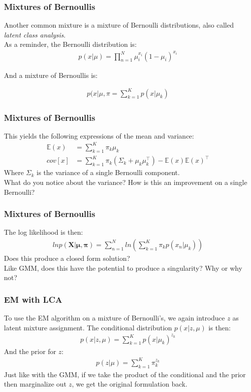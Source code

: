 \documentclass{beamer}
\begin{document}
\begin{frame}
\frametitle{Mixtures of Bernoullis}
	Another common mixture is a mixture of Bernoulli distributions, also called \textit{latent class analysis}.\\
	As a reminder, the Bernoulli distribution is:
	\begin{align*}
	p(x|\mu) = \prod_{n = 1}^{N} \mu_i^{x_i}(1 - \mu_i)^{x_i}
	\end{align*}
	
	And a mixture of Bernoullis is:
	
	\begin{align*}
		p(x|\mu, \pi = \sum_{k=1}^{K}p(x|\mu_k) 
	\end{align*}
\end{frame}


\begin{frame}
\frametitle{Mixtures of Bernoullis}
	This yields the following expressions of the mean and variance:
	\begin{align*}
	\mathbb{E}(x)& = \sum_{k=1}^{K} \pi_k \mu_k \\
	cov[x]  &= \sum_{k=1}^{K}  \pi_k (\Sigma_k + \mu_k \mu_k^{\intercal}) - \mathbb{E}(x)\mathbb{E}(x)^{\intercal}
	\end{align*}
	Where $\Sigma_{k}$ is the variance of a single Bernoulli component.\\
	What do you notice about the variance? How is this an improvement on a single Bernoulli?
\end{frame}

\begin{frame}
\frametitle{Mixtures of Bernoullis}
	The log likelihood is then:
	\begin{align*}
	ln p(\mathbf{X}|\mathbf{\mu}, \mathbf{\pi}) = \sum_{n=1}^{N} ln (\sum_{k =1}^{K} \pi_k p(x_n|\mu_k))
	\end{align*}
	Does this produce a closed form solution?\\
	Like GMM, does this have the potential to produce a singularity? Why or why not?
\end{frame}

\begin{frame}
\frametitle{EM with LCA}
	To use the EM algorithm on a mixture of Bernoulli's, we again introduce $z$ as latent mixture assignment. The conditional distribution $p(x|z, \mu)$ is then:
	\begin{align*}
	p(x|z, \mu) = \sum_{k=1}^{K} p(x|\mu_k)^{z_k}
	\end{align*}
	And the prior for $z$:
	\begin{align*}
	p(z|\mu) = \sum_{k=1}^{K} \pi_k^{z_k}
	\end{align*}
	Just like with the GMM, if we take the product of the conditional and the prior then marginalize out $z$, we get the original formulation back.
\end{frame}
\end{document}
